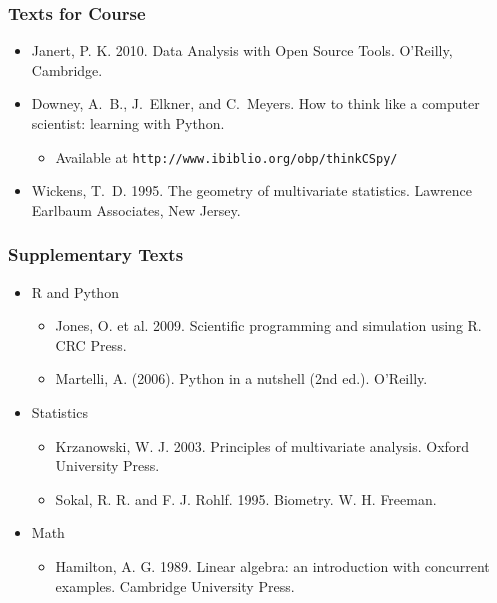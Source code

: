 \documentclass{beamer}
\begin{document}
\begin{frame}
  \frametitle{Texts for Course}

\begin{itemize}

\item Janert, P. K. 2010. Data Analysis with Open Source Tools. O'Reilly, Cambridge.

\item Downey, A.\ B., J.\ Elkner, and C.\ Meyers. How to think like a computer scientist: learning with Python. 
\begin{itemize}
	\item Available at \texttt{http://www.ibiblio.org/obp/thinkCSpy/}
\end{itemize}

\item Wickens, T.\ D. 1995. The geometry of multivariate statistics. Lawrence Earlbaum Associates, New Jersey. 

\end{itemize}

\end{frame}


\begin{frame}
  \frametitle{Supplementary Texts}
\begin{itemize}

\item R and Python
\begin{itemize}
    \item Jones, O. et al. 2009. Scientific programming and simulation using R. CRC Press.
	\item Martelli, A. (2006). Python in a nutshell (2nd ed.). O'Reilly. 
\end{itemize}
\item Statistics
\begin{itemize}
	\item Krzanowski, W. J. 2003. Principles of multivariate analysis. Oxford University Press.
	\item Sokal, R. R. and F. J. Rohlf. 1995. Biometry. W. H. Freeman.
\end{itemize}
\item Math
\begin{itemize}
	\item Hamilton, A. G. 1989. Linear algebra: an introduction with concurrent examples. Cambridge University Press.
	
\end{itemize}
\end{itemize}

\end{frame}
\end{document}
